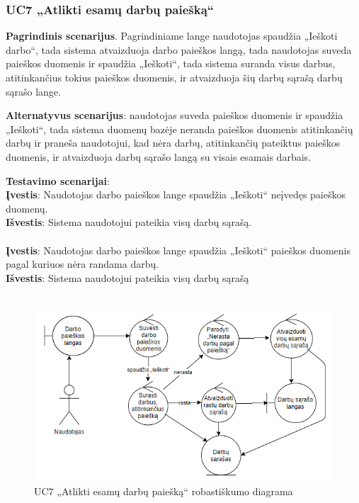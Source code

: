 \documentclass{VUMIFPSbakalaurinis}
\begin{document}
\subsubsection{UC7 „Atlikti esamų darbų paiešką“}
\textbf{Pagrindinis scenarijus}. Pagrindiniame lange naudotojas spaudžia „Ieškoti darbo“, tada sistema atvaizduoja darbo paieškos langą, tada naudotojas suveda paieškos duomenis ir spaudžia „Ieškoti“, tada sistema suranda visus darbus, atitinkančius tokius paieškos duomenis, ir atvaizduoja šių darbų sąrašą darbų sąrašo lange. 
\par \textbf{Alternatyvus scenarijus}: naudotojas suveda paieškos duomenis ir spaudžia „Ieškoti“, tada sistema duomenų bazėje neranda paieškos duomenis atitinkančių darbų ir praneša naudotojui, kad nėra darbų, atitinkančių pateiktus paieškos duomenis, ir atvaizduoja darbų sąrašo langą su visais esamais darbais.
\par \textbf{Testavimo scenarijai}:\\
\textbf{Įvestis}: Naudotojas darbo paieškos lange spaudžia „Ieškoti“ neįvedęs paieškos duomenų. \\
\textbf{Išvestis}: Sistema naudotojui pateikia visų darbų sąrašą. \\ \\
\textbf{Įvestis}: Naudotojas darbo paieškos lange spaudžia „Ieškoti“ paieškos duomenis pagal kuriuos nėra randama darbų. \\
\textbf{Išvestis}: Sistema naudotojui pateikia visų darbų sąrašą\\ \\

\begin{figure}[H]
	\centering
	\includegraphics[scale=0.6]{img/Robustness/UC7}
	\caption{UC7 „Atlikti esamų darbų paiešką“ robastiškumo diagrama}
	\label{img:uc7rob}
\end{figure}
\end{document}
